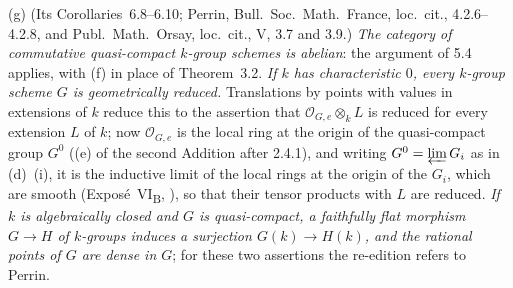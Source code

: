 (g) (Its Corollaries~6.8--6.10; Perrin, Bull.\ Soc.\ Math.\ France, loc.\ cit., 4.2.6--4.2.8, and
Publ.\ Math.\ Orsay, loc.\ cit., V, 3.7 and 3.9.) \emph{The category of commutative quasi-compact
\(k\)-group schemes is abelian}: the argument of 5.4 applies, with (f) in place of Theorem~3.2.
\emph{If \(k\) has characteristic \(0\), every \(k\)-group scheme \(G\) is geometrically reduced.}
Translations by points with values in extensions of \(k\) reduce this to the assertion that
\(\mathcal O_{G,e}\otimes_kL\) is reduced for every extension \(L\) of \(k\); now
\(\mathcal O_{G,e}\) is the local ring at the origin of the quasi-compact group \(G^0\) ((e) of the
second Addition after 2.4.1), and writing \(G^0=\varprojlim G_i\) as in (d)~(i), it is the inductive
limit of the local rings at the origin of the \(G_i\), which are smooth (Exposé~VI\textsubscript{B},
), so that their tensor products with \(L\) are reduced.
\emph{If \(k\) is algebraically closed and \(G\) is quasi-compact, a faithfully flat morphism
\(G\to H\) of \(k\)-groups induces a surjection \(G(k)\to H(k)\), and the rational points of \(G\) are
dense in \(G\)}; for these two assertions the re-edition refers to Perrin.
